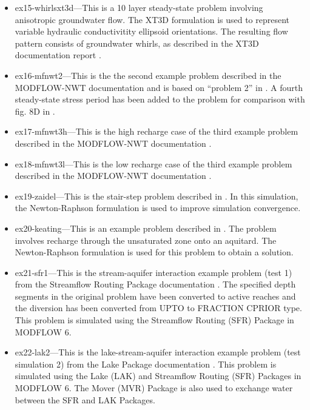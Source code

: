 \begin{itemize}
\item ex15-whirlsxt3d---This is a 10 layer steady-state problem involving anisotropic groundwater flow.  The XT3D formulation is used to represent variable hydraulic conductivitity ellipsoid orientations.  The resulting flow pattern consists of groundwater whirls, as described in the XT3D documentation report \citep{modflow6xt3d}.

\item ex16-mfnwt2---This is the the second example problem described in the MODFLOW-NWT documentation \cite{modflownwt} and is based on ``problem 2'' in \cite{mcdonaldetal1991wetdry}. A fourth steady-state stress period has been added to the problem for comparison with fig. 8D in \cite{modflownwt}.

\item ex17-mfnwt3h---This is the high recharge case of the third example problem described in the MODFLOW-NWT documentation \citep{modflownwt}.

\item ex18-mfnwt3l---This is the low recharge case of the third example problem described in the MODFLOW-NWT documentation \citep{modflownwt}.

\item ex19-zaidel---This is the stair-step problem described in \cite{zaidel2013discontinuous}.  In this simulation, the Newton-Raphson formulation is used to improve simulation convergence.

\item ex20-keating---This is an example problem described in \cite{keating2009stable}.  The problem involves recharge through the unsaturated zone onto an aquitard.  The Newton-Raphson formulation is used for this problem to obtain a solution.

\item ex21-sfr1---This is the stream-aquifer interaction example problem (test 1) from the Streamflow Routing Package documentation \citep{prudic1989str}.  The specified depth segments in the original problem have been converted to active reaches and the diversion has been converted from UPTO to FRACTION CPRIOR type. This problem is simulated using the Streamflow Routing (SFR) Package in MODFLOW 6.

\item ex22-lak2---This is the lake-stream-aquifer interaction example problem (test simulation 2) from the Lake Package documentation \citep{modflowlak3pack}.  This problem is simulated using the Lake (LAK) and Streamflow Routing (SFR) Packages in MODFLOW 6. The Mover (MVR) Package is also used to exchange water between the SFR and LAK Packages.


\end{itemize}
